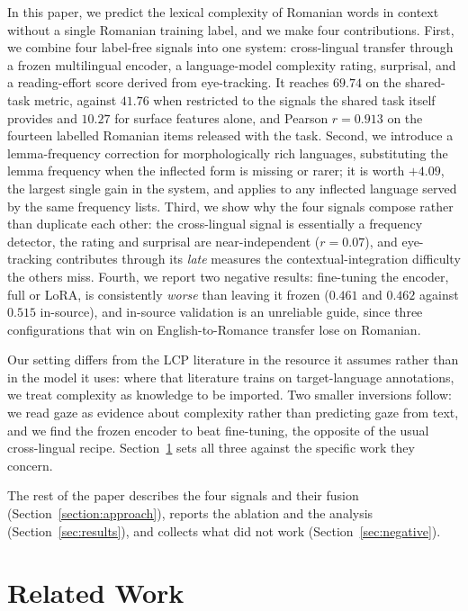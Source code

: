 In this paper, we predict the lexical complexity of Romanian words in
context without a single Romanian training label, and we make four
contributions. First, we combine four label-free signals into one
system: cross-lingual transfer through a frozen multilingual encoder, a
language-model complexity rating, surprisal, and a reading-effort score
derived from eye-tracking. It reaches $69.74$ on the shared-task metric,
against $41.76$ when restricted to the signals the shared task itself
provides and $10.27$ for surface features alone, and Pearson
$r = 0.913$ on the fourteen labelled Romanian items released with the
task. Second, we introduce a lemma-frequency correction for
morphologically rich languages, substituting the lemma frequency when the
inflected form is missing or rarer; it is worth $+4.09$, the largest
single gain in the system, and applies to any inflected language served
by the same frequency lists. Third, we show why the four signals compose
rather than duplicate each other: the cross-lingual signal is essentially
a frequency detector, the rating and surprisal are near-independent
($r = 0.07$), and eye-tracking contributes through its \emph{late}
measures the contextual-integration difficulty the others miss.
Fourth, we report two negative results: fine-tuning the encoder, full or
LoRA, is consistently \emph{worse} than leaving it frozen ($0.461$ and
$0.462$ against $0.515$ in-source), and in-source validation is an
unreliable guide, since three configurations that win on
English-to-Romance transfer lose on Romanian.

Our setting differs from the LCP literature in the resource it assumes
rather than in the model it uses: where that literature trains on
target-language annotations, we treat complexity as knowledge to be
imported. Two smaller inversions follow: we read gaze as evidence about
complexity rather than predicting gaze from text, and we find the frozen
encoder to beat fine-tuning, the opposite of the usual cross-lingual
recipe. Section~\ref{sec:related} sets all three against the specific
work they concern.

The rest of the paper describes the four signals and their fusion
(Section~\ref{section:approach}), reports the ablation and the analysis
(Section~\ref{sec:results}), and collects what did not work
(Section~\ref{sec:negative}).


\section{Related Work}
\label{sec:related}

